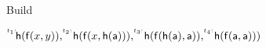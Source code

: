 
\begin{block}{Build}
	
$
\TI{t_1}\mh(\mf(x,y)), 
\TI{t_2}\mh(\mf(x,\mh(\ma))),
\TI{t_3}\mh(\mf(\mh(\ma),\ma)),
\TI{t_4}\mh(\mf(\ma,\ma)))
$

\end{block}